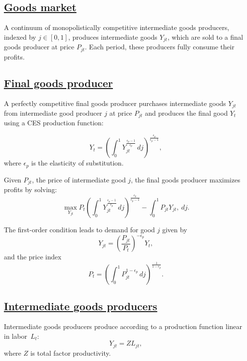 \documentclass[qe,draft]{econsocart}
\theoremstyle{plain}
\theoremstyle{definition}
\begin{document}
\subsection{\href{https://econ-ark.github.io/HAFiscal/\#sec:goods-market}{Goods market}}\label{sec:goods-market}

A continuum of monopolistically competitive intermediate goods producers, indexed by \( j \in [0,1] \), produces intermediate goods \( Y_{jt} \), which are sold to a final goods producer at price \( P_{jt} \). Each period, these producers fully consume their profits.

\subsection{\href{https://econ-ark.github.io/HAFiscal/\#sec:hank-final-goods-producer}{Final goods producer}}\label{sec:hank-final-goods-producer}

A perfectly competitive final goods producer purchases intermediate goods \( Y_{jt} \) from intermediate good producer $j$ at price \( P_{jt} \) and produces the final good \( Y_t \) using a CES production function:

\[
  Y_{t} = {\left(\int_{0}^{1} Y_{jt}^{\frac{\epsilon_{p}-1}{\epsilon_{p}}}\, dj\right)}^{\frac{\epsilon_{p}}{\epsilon_{p}-1}},
\]
where $\epsilon_{p}$ is the elasticity of substitution.

Given $P_{jt}$, the price of intermediate good $j$, the final goods producer maximizes profits by solving:
\[
  \max_{Y_{jt}} P_{t} {\left(\int_{0}^{1} Y_{jt}^{\frac{\epsilon_{p}-1}{\epsilon_{p}}}\, dj\right)}^{\frac{\epsilon_{p}}{\epsilon_{p}-1}} - \int_{0}^{1} P_{jt} Y_{jt} ,\ dj.
\]

The first-order condition leads to demand for good $j$ given by
\[
  Y_{jt} = {\left(\frac {P_{jt}}{P_{t}}\right)}^{- \epsilon_{p}} Y_{t},
\]
and the price index
\[
  P_{t} = {\left(\int_{0}^{1} P_{jt}^{1-\epsilon_{p}}\,dj \right )}^{\frac{1}{1-\epsilon_{p}}}.
\]

\subsection{\href{https://econ-ark.github.io/HAFiscal/\#sec:hank-intermediate-goods-producers}{Intermediate goods producers}}\label{sec:hank-intermediate-goods-producers}

Intermediate goods producers produce according to a production function linear in labor~$L_{t}$:
\[
  Y_{jt} =  Z L_{jt},
\]
where $Z$ is total factor productivity.
\end{document}
